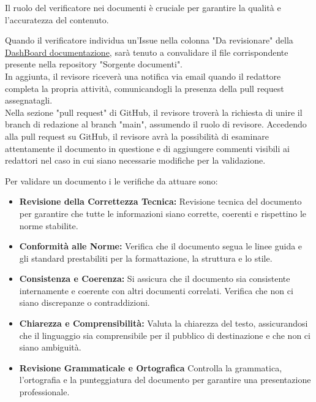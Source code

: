 Il ruolo del verificatore nei documenti è cruciale per garantire la qualità e l'accuratezza del contenuto.

Quando il verificatore individua un'Issue nella colonna "Da revisionare" della  \href{https://github.com/orgs/ByteOps-swe/projects/1/views/1}{DashBoard documentazione}, sarà tenuto a convalidare il file corrispondente presente nella repository "Sorgente documenti". \\
In aggiunta, il revisore riceverà una notifica via email quando il redattore completa la propria attività, comunicandogli la presenza della pull request assegnatagli.\\
Nella sezione "pull request" di GitHub, il revisore troverà la richiesta di unire il branch di redazione al branch "main", assumendo il ruolo di revisore. Accedendo alla pull request su GitHub, il revisore avrà la possibilità di esaminare attentamente il documento in questione e di aggiungere commenti visibili ai redattori nel caso in cui siano necessarie modifiche per la validazione.

\vspace{0.3cm}

Per validare un documento i le verifiche da attuare sono:
\begin{itemize}
    \item \textbf{Revisione della Correttezza Tecnica:} Revisione tecnica del documento per garantire che tutte le informazioni siano corrette, coerenti e rispettino le norme stabilite.
    \item \textbf{Conformità alle Norme:} Verifica che il documento segua le linee guida e gli standard prestabiliti per la formattazione, la struttura e lo stile.
    \item \textbf{Consistenza e Coerenza:} Si assicura che il documento sia consistente internamente e coerente con altri documenti correlati. Verifica che non ci siano discrepanze o contraddizioni.
    \item \textbf{Chiarezza e Comprensibilità:} Valuta la chiarezza del testo, assicurandosi che il linguaggio sia comprensibile per il pubblico di destinazione e che non ci siano ambiguità.
    \item \textbf{Revisione Grammaticale e Ortografica} Controlla la grammatica, l'ortografia e la punteggiatura del documento per garantire una presentazione professionale.
\end{itemize}


